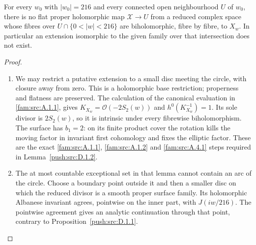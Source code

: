\begin{theorem}\hypertarget{tag-032C}{}\label{push:src:D.1.3}

For every \(w_0\) with \(|w_0|=216\) and every connected open
neighbourhood \(U\) of \(w_0\), there is no flat proper holomorphic
map \(\mathcal X\to U\) from a reduced complex space whose fibres
over \(U\cap\{0<|w|<216\}\) are biholomorphic, fibre by fibre, to
\(X_w\). In particular an extension isomorphic to the given family
over that intersection does not exist.
\end{theorem}


\begin{proof}
\begin{enumerate}[label=\arabic*.,leftmargin=*]
\item We may restrict a putative extension to a small disc meeting the
circle, with closure away from zero. This is a holomorphic base
restriction; properness and flatness are preserved. The calculation
of the canonical evaluation in \cref{fam:src:A.1.1}, gives
\(K_{X_w}=\mathcal O(-2S_2(w))\) and
\(h^0(K_{X_w}^{-1})=1\). Its sole divisor is \(2S_2(w)\), so it is
intrinsic under every fibrewise biholomorphism. The surface has
\(b_1=2\): on its finite product cover the rotation kills the moving
factor in invariant first cohomology and fixes the elliptic factor.
These are the exact \cref{fam:src:A.1.1}, \cref{fam:src:A.1.2} and \cref{fam:src:A.4.1} steps required in Lemma~\ref{push:src:D.1.2}.

\item The at most countable exceptional set in that lemma cannot contain
an arc of the circle. Choose a boundary point outside it and then a smaller disc
on which the reduced divisor is a smooth proper surface family. Its
holomorphic Albanese invariant agrees, pointwise on the inner part,
with \(J(iw/216)\). The pointwise agreement gives an analytic continuation through
that point, contrary to Proposition~\ref{push:src:D.1.1}.
\end{enumerate}
\end{proof}